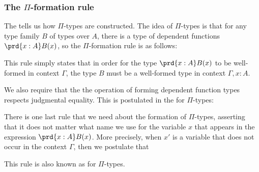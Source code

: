 \subsubsection{The $\Pi$-formation rule}
The  tells us how $\Pi$-types are constructed. The idea of $\Pi$-types is that for any type family $B$ of types over $A$, there is a type of dependent functions $\prd{x:A}B(x)$, so the $\Pi$-formation rule is as follows:
\begin{prooftree}
\end{prooftree}
This rule simply states that in order for the type $\prd{x:A}B(x)$ to be well-formed in context $\Gamma$, the type $B$ must be a well-formed type in context $\Gamma,x:A$.

We also require that the the operation of forming dependent function types respects judgmental equality. This is postulated in the  for $\Pi$-types:
\begin{prooftree}
\end{prooftree}

There is one last rule that we need about the formation of $\Pi$-types, asserting that it does not matter what name we use for the variable $x$ that appears in the expression $\prd{x:A}B(x)$.
More precisely, when $x'$ is a variable that does not occur in the context $\Gamma$, then we postulate that
\begin{prooftree}
\end{prooftree}
This rule is also known as  for $\Pi$-types.

